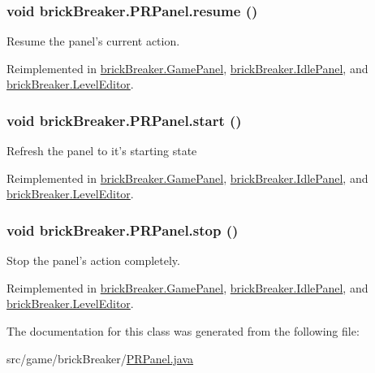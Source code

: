 \hypertarget{classbrick_breaker_1_1_p_r_panel_ac9aadc88543f9032a27f3eb2b8ea908b}{
\subsubsection[{resume}]{\setlength{\rightskip}{0pt plus 5cm}void brickBreaker.PRPanel.resume ()}}
\label{classbrick_breaker_1_1_p_r_panel_ac9aadc88543f9032a27f3eb2b8ea908b}
Resume the panel's current action. 

Reimplemented in \hyperlink{classbrick_breaker_1_1_game_panel_af987d9ffe6d1d68941a93547bab41cfe}{brickBreaker.GamePanel}, \hyperlink{classbrick_breaker_1_1_idle_panel_ab04b565d2e626077051cefb27772a98f}{brickBreaker.IdlePanel}, and \hyperlink{classbrick_breaker_1_1_level_editor_a25e9ea0a6e91f1848c3b76f66a238789}{brickBreaker.LevelEditor}.

\hypertarget{classbrick_breaker_1_1_p_r_panel_a94e190e70d6aa937068cbf5e8cff523e}{
\subsubsection[{start}]{\setlength{\rightskip}{0pt plus 5cm}void brickBreaker.PRPanel.start ()}}
\label{classbrick_breaker_1_1_p_r_panel_a94e190e70d6aa937068cbf5e8cff523e}
Refresh the panel to it's starting state 

Reimplemented in \hyperlink{classbrick_breaker_1_1_game_panel_ac06637c2b612d44711aebefde82249bc}{brickBreaker.GamePanel}, \hyperlink{classbrick_breaker_1_1_idle_panel_ad391091a78283ca2546e52f967d46ed6}{brickBreaker.IdlePanel}, and \hyperlink{classbrick_breaker_1_1_level_editor_ab2df7eb7b75f4e87b25c4b2d9422dc3d}{brickBreaker.LevelEditor}.

\hypertarget{classbrick_breaker_1_1_p_r_panel_ad077fab978f84663f366a6fdde5efe6c}{
\subsubsection[{stop}]{\setlength{\rightskip}{0pt plus 5cm}void brickBreaker.PRPanel.stop ()}}
\label{classbrick_breaker_1_1_p_r_panel_ad077fab978f84663f366a6fdde5efe6c}
Stop the panel's action completely. 

Reimplemented in \hyperlink{classbrick_breaker_1_1_game_panel_adda952b668cd479832134a4c0ddfbc41}{brickBreaker.GamePanel}, \hyperlink{classbrick_breaker_1_1_idle_panel_a2334ae977477929eeb82dbba53384360}{brickBreaker.IdlePanel}, and \hyperlink{classbrick_breaker_1_1_level_editor_aa38941ac69b2b38f472fd402d3e33e40}{brickBreaker.LevelEditor}.



The documentation for this class was generated from the following file:\begin{DoxyCompactItemize}
\item 
src/game/brickBreaker/\hyperlink{_p_r_panel_8java}{PRPanel.java}\end{DoxyCompactItemize}
